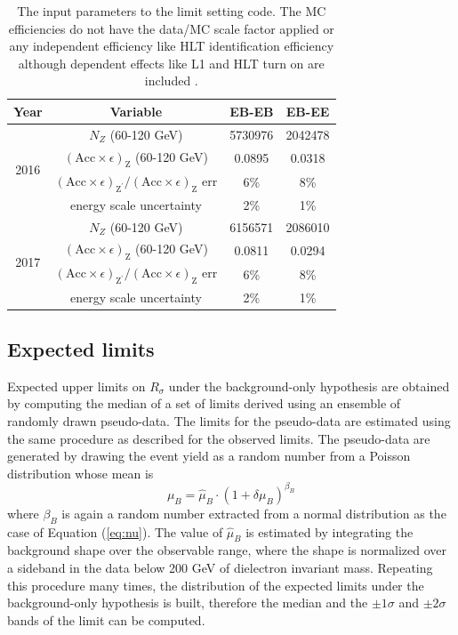 \begin{table} [t]
\begin{center}
\begin{tabular}{|c|c|c|c|} \hline
Year                 &Variable                                 & EB-EB   & EB-EE \\\hline
\multirow{4}{*}{2016}&$N_{Z}$ (60-120 GeV)                     & 5730976 & 2042478 \\
                     &$(\mathrm{Acc}\times\epsilon)_{\mathrm{Z}}$ (60-120 GeV)            & 0.0895  & 0.0318 \\
                     &$(\mathrm{Acc}\times\epsilon)_{\mathrm{Z}^{'}}/(\mathrm{Acc}\times\epsilon)_{\mathrm{Z}}$ err & 6\%     & 8\%\\
                     &energy scale uncertainty                 &  2\%    & 1\% \\ \hline
\multirow{4}{*}{2017}&$N_{Z}$ (60-120 GeV)                     & 6156571 & 2086010 \\
                     &$(\mathrm{Acc}\times\epsilon)_{\mathrm{Z}}$ (60-120 GeV)            & 0.0811  & 0.0294 \\
                     &$(\mathrm{Acc}\times\epsilon)_{\mathrm{Z}^{'}}/(\mathrm{Acc}\times\epsilon)_{\mathrm{Z}}$ err & 6\%     & 8\%\\
                     &energy scale uncertainty                 &  2\%    & 1\% \\ \hline
\end{tabular}
\caption{The input parameters to the limit setting code. The MC efficiencies do not have the data/MC scale factor applied or any \et independent efficiency like HLT identification efficiency although \et dependent effects like L1 and HLT turn on are included \cite{CMS-AN-2016-404,CMS-AN-2018-021}.}
\label{tab:limitInput}
\end{center}
\end{table}

\subsection*{Expected limits}
Expected upper limits on $R_\sigma$ under the background-only hypothesis are obtained by computing the median of a set of limits derived using an ensemble
of randomly drawn pseudo-data. The limits for the pseudo-data are
estimated using the same procedure as described for the observed limits. The pseudo-data are generated by drawing the event yield as a random number from a Poisson distribution whose mean is
\begin{equation}
\label{eq:exp_mu}
\mu_{B} = \hat{\mu}_{B} \cdot (1 + \delta\mu_{B})^{\beta_{B}}
\end{equation}
where $\beta_{B}$ is again a random number extracted from a normal distribution as the case of Equation (\ref{eq:nu}). The value of $\hat{\mu}_{B}$ is estimated by integrating
the background shape over the observable range, where the shape is normalized over a sideband in the data below 200 GeV of dielectron invariant mass.
Repeating this procedure many times, the distribution of the expected limits under the background-only hypothesis is built, therefore the median and the $\pm1\sigma$ and $\pm2\sigma$ bands of the limit can be computed.



